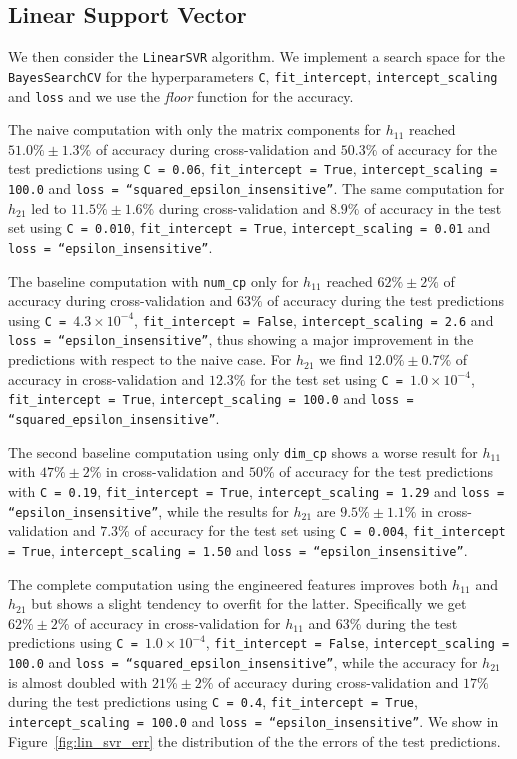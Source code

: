 \subsection{Linear Support Vector}
    We then consider the \texttt{LinearSVR} algorithm. We implement a search space for the \texttt{BayesSearchCV} for the hyperparameters \texttt{C}, \texttt{fit\_intercept}, \texttt{intercept\_scaling} and \texttt{loss} and we use the \textit{floor} function for the accuracy.
    
    The naive computation with only the matrix components for $h_{11}$ reached $51.0\% \pm 1.3\%$ of accuracy during cross-validation and $50.3\%$ of accuracy for the test predictions using  \texttt{C = 0.06}, \texttt{fit\_intercept = True}, \texttt{intercept\_scaling = 100.0} and \texttt{loss = ``squared\_epsilon\_insensitive''}. The same computation for $h_{21}$ led to $11.5\% \pm 1.6\%$ during cross-validation and $8.9\%$ of accuracy in the test set using \texttt{C = 0.010}, \texttt{fit\_intercept = True}, \texttt{intercept\_scaling = 0.01} and \texttt{loss = ``epsilon\_insensitive''}.
    
    The baseline computation with \texttt{num\_cp} only for $h_{11}$ reached $62\% \pm 2\%$ of accuracy during cross-validation and $63\%$ of accuracy during the test predictions using \texttt{C = $4.3 \times 10^{-4}$}, \texttt{fit\_intercept = False}, \texttt{intercept\_scaling = 2.6} and \texttt{loss = ``epsilon\_insensitive''}, thus showing a major improvement in the predictions with respect to the naive case. For $h_{21}$ we find $12.0\% \pm 0.7\%$ of accuracy in cross-validation and $12.3\%$ for the test set using \texttt{C = $1.0 \times 10^{-4}$}, \texttt{fit\_intercept = True}, \texttt{intercept\_scaling = 100.0} and \texttt{loss = ``squared\_epsilon\_insensitive''}.
    
    The second baseline computation using only \texttt{dim\_cp} shows a worse result for $h_{11}$ with $47\% \pm 2\%$ in cross-validation and $50\%$ of accuracy for the test predictions with \texttt{C = 0.19}, \texttt{fit\_intercept = True}, \texttt{intercept\_scaling = 1.29} and \texttt{loss = ``epsilon\_insensitive''}, while the results for $h_{21}$ are $9.5\% \pm 1.1\%$ in cross-validation and $7.3\%$ of accuracy for the test set using \texttt{C = 0.004}, \texttt{fit\_intercept = True}, \texttt{intercept\_scaling = 1.50} and \texttt{loss = ``epsilon\_insensitive''}.
    
    The complete computation using the engineered features improves both $h_{11}$ and $h_{21}$ but shows a slight tendency to overfit for the latter. Specifically we get $62\% \pm 2\%$ of accuracy in cross-validation for $h_{11}$ and $63\%$ during the test predictions using \texttt{C = $1.0 \times 10^{-4}$}, \texttt{fit\_intercept = False}, \texttt{intercept\_scaling = 100.0} and \texttt{loss = ``squared\_epsilon\_insensitive''}, while the accuracy for $h_{21}$ is almost doubled with $21\% \pm 2\%$ of accuracy during cross-validation and $17\%$ during the test predictions using \texttt{C = 0.4}, \texttt{fit\_intercept = True}, \texttt{intercept\_scaling = 100.0} and \texttt{loss = ``epsilon\_insensitive''}. We show in Figure~\ref{fig:lin_svr_err} the distribution of the the errors of the test predictions.
    
